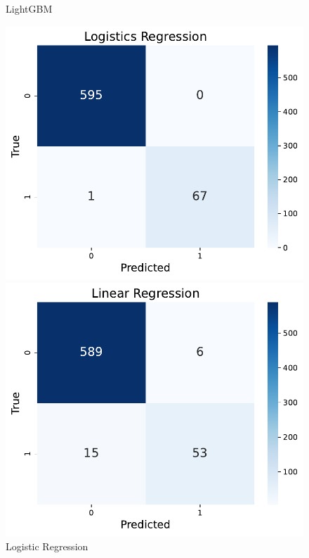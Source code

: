 \documentclass[10pt,letterpaper]{article}
\begin{document}
\begin{figure}[H]
\begin{minipage}{0.32\textwidth}
        \caption{LightGBM}
        \label{fig:cm-lgbm}
    \end{minipage}\hfill
    \begin{minipage}{0.32\textwidth}
        \centering
        \includegraphics[width=\linewidth]{plots/lgs_reg_confusion_matrix.pdf}
        \caption{Logistic Regression}
        \label{fig:cm-lgs_reg}
    \end{minipage}
    \vspace{1em}
    \begin{minipage}{0.32\textwidth}
        \centering
        \includegraphics[width=\linewidth]{plots/linear_confusion_matrix.pdf}

\end{minipage}
\end{figure}
\end{document}
